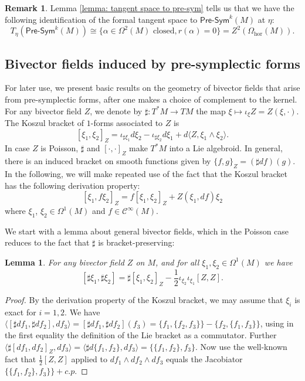 \documentclass[11pt,thmsa]{amsart}
\newtheorem{lemma}[theorem]{Lemma}
\theoremstyle{definition}
\newtheorem{remark}[theorem]{Remark}
\newcommand{\Presym}{\mathsf{Pre}\textrm{-}\mathsf{Sym}}
\newcommand{\hor}{\mathrm{hor}}
\newcommand{\smooth}{\mathcal{C}}
\begin{document}
\begin{remark}\label{rem:tpres}
Lemma \ref{lemma: tangent space to pre-sym} tells us that
we have the following identification of the formal tangent space to $\Presym^k(M)$ at $\eta$:
$$ T_\eta \left(\Presym^k(M)\right)  \cong \{\alpha \in \Omega^2(M) \textrm{ closed}, r(\alpha)=0\} = Z^2(\Omega_\hor(M)).$$
\end{remark}






\subsection{Bivector fields induced by pre-symplectic forms}\label{section: bivec}



For later use,  
we present basic results on the geometry of bivector fields that arise from  pre-symplectic forms, after one makes a choice of complement to the kernel. For any bivector field $Z$, we denote by $\sharp \colon T^*M\to TM$ the map $\xi\mapsto \iota_{\xi}Z=Z(\xi,\cdot)$. The Koszul bracket of $1$-forms  associated to $Z$ is 
\begin{equation}
\label{eq:KoszulBracket1f}
[\xi_1,\xi_2]_{Z}=\iota_{\sharp \xi_1}d\xi_2-\iota_{\sharp \xi_2}d\xi_1+d\langle Z, \xi_1\wedge \xi_2\rangle. 
\end{equation}
In case $Z$ is Poisson, $\sharp$ and $[\cdot,\cdot]_Z$ make $T^*M$ into a Lie algebroid. In general, there is an induced bracket on smooth functions given by $\{f,g\}_Z=(\sharp df)(g)$.
In the following, we will make repeated use of the fact that the Koszul bracket has the following derivation property:
$$[\xi_1, f\xi_2]_Z= f[\xi_1,\xi_2]_Z + Z(\xi_1,df)\xi_2 $$
where $\xi_1$, $\xi_2\in \Omega^1(M)$ and $f\in \smooth^\infty(M)$.

 
 We start with a lemma about general bivector fields, which in the Poisson case reduces to the fact that $\sharp$ is bracket-preserving:
\begin{lemma}\label{lem:bivector}
For any bivector field $Z$ on $M$, and for all $\xi_1,\xi_2\in \Omega^1(M)$ we have
\begin{equation}\label{eq:sharpnothom}
[\sharp \xi_1,\sharp \xi_2]=\sharp [\xi_1,\xi_2]_{Z}-\frac{1}{2}\iota_{\xi_2}\iota_{\xi_1}[Z,Z].
\end{equation}
 \end{lemma}
\begin{proof}
By the derivation property of the Koszul bracket, we may assume that $\xi_i$ is exact for $i=1,2$.
We have $\langle [\sharp df_1,\sharp df_2],df_3\rangle=
 [\sharp df_1,\sharp df_2](f_3)=\{f_1,\{f_2,f_3\}\}-\{f_2,\{f_1,f_3\}\}$,
 using in the first equality the definition of the Lie bracket as a commutator. Further
 $\langle \sharp[df_1,df_2]_{Z},df_3\rangle= 
  \langle \sharp d\{f_1,f_2\},df_3\rangle=
  \{\{f_1,f_2\},f_3\}$. Now use the well-known fact that $\frac{1}{2}[Z,Z]$ applied to $df_1\wedge df_2\wedge df_3$ equals the Jacobiator  $\{\{f_1,f_2\},f_3\}\}+c.p.$
\end{proof}
\end{document}

